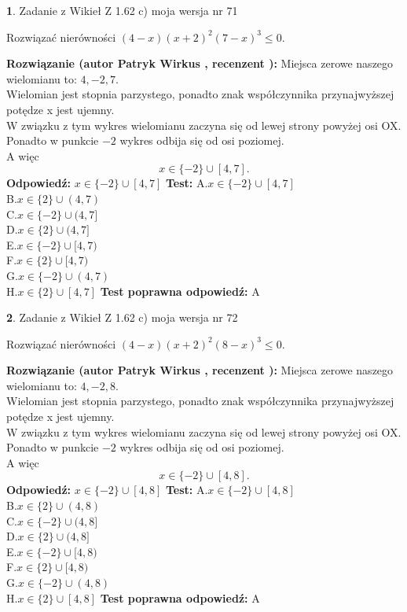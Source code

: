 \documentclass[12pt, a4paper]{article}
\theoremstyle{definition} %
\newtheorem{zad}{}
\newcommand{\zadStart}[1]{\begin{zad}#1\newline}
\newcommand{\zadStop}{\end{zad}}
\newcommand{\rozwStart}[2]{\noindent \textbf{Rozwiązanie (autor #1 , recenzent #2): }\newline}
\newcommand{\rozwStop}{\newline}
\newcommand{\odpStart}{\noindent \textbf{Odpowiedź:}\newline}
\newcommand{\odpStop}{\newline}
\newcommand{\testStart}{\noindent \textbf{Test:}\newline}
\newcommand{\testStop}{\newline}
\newcommand{\kluczStart}{\noindent \textbf{Test poprawna odpowiedź:}\newline}
\newcommand{\kluczStop}{\newline}
\begin{document}
\zadStart{Zadanie z Wikieł Z 1.62 c) moja wersja nr 71}

Rozwiązać nierówności $(4-x)(x+2)^{2}(7-x)^{3}\le0$.
\zadStop
\rozwStart{Patryk Wirkus}{}
Miejsca zerowe naszego wielomianu to: $4, -2, 7$.\\
Wielomian jest stopnia parzystego, ponadto znak współczynnika przy\linebreak najwyższej potędze x jest ujemny.\\ W związku z tym wykres wielomianu zaczyna się od lewej strony powyżej osi OX.\\
Ponadto w punkcie $-2$ wykres odbija się od osi poziomej.\\
A więc $$x \in \{-2\} \cup [4,7].$$
\rozwStop
\odpStart
$x \in \{-2\} \cup [4,7]$
\odpStop
\testStart
A.$x \in \{-2\} \cup [4,7]$\\
B.$x \in \{2\} \cup (4,7)$\\
C.$x \in \{-2\} \cup (4,7]$\\
D.$x \in \{2\} \cup (4,7]$\\
E.$x \in \{-2\} \cup [4,7)$\\
F.$x \in \{2\} \cup [4,7)$\\
G.$x \in \{-2\} \cup (4,7)$\\
H.$x \in \{2\} \cup [4,7]$
\testStop
\kluczStart
A
\kluczStop



\zadStart{Zadanie z Wikieł Z 1.62 c) moja wersja nr 72}

Rozwiązać nierówności $(4-x)(x+2)^{2}(8-x)^{3}\le0$.
\zadStop
\rozwStart{Patryk Wirkus}{}
Miejsca zerowe naszego wielomianu to: $4, -2, 8$.\\
Wielomian jest stopnia parzystego, ponadto znak współczynnika przy\linebreak najwyższej potędze x jest ujemny.\\ W związku z tym wykres wielomianu zaczyna się od lewej strony powyżej osi OX.\\
Ponadto w punkcie $-2$ wykres odbija się od osi poziomej.\\
A więc $$x \in \{-2\} \cup [4,8].$$
\rozwStop
\odpStart
$x \in \{-2\} \cup [4,8]$
\odpStop
\testStart
A.$x \in \{-2\} \cup [4,8]$\\
B.$x \in \{2\} \cup (4,8)$\\
C.$x \in \{-2\} \cup (4,8]$\\
D.$x \in \{2\} \cup (4,8]$\\
E.$x \in \{-2\} \cup [4,8)$\\
F.$x \in \{2\} \cup [4,8)$\\
G.$x \in \{-2\} \cup (4,8)$\\
H.$x \in \{2\} \cup [4,8]$
\testStop
\kluczStart
A
\kluczStop
\end{document}
